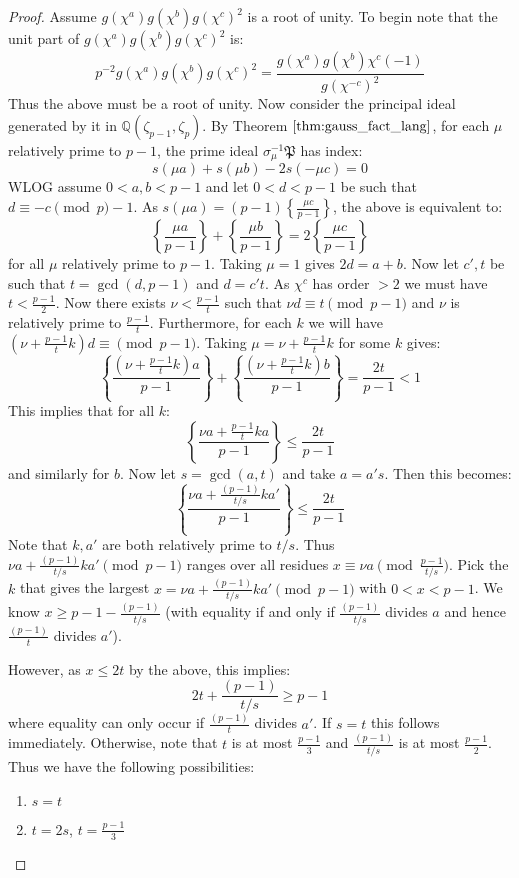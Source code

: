 \documentclass{article}
\newcommand{\Q}{\mathbb{Q}}
\newcommand{\frp}[2]{\left\{\frac{#1}{#2}\right\}}
\theoremstyle{definition}
\theoremstyle{definition}
\theoremstyle{remark}
\begin{document}
\begin{proof} Assume $g(\chi^a)g(\chi^b)g(\chi^c)^2$ is a root of unity. To begin note that the unit part of $g(\chi^a)g(\chi^b)g(\chi^c)^2$ is:
\[p^{-2}g(\chi^a)g(\chi^b)g(\chi^c)^2 = \frac{g(\chi^a)g(\chi^b)\chi^{c}(-1)}{g(\chi^{-c})^2 } \]
Thus the above must be a root of unity. Now consider the principal ideal generated by it in $\Q(\zeta_{p-1}, \zeta_p)$. By Theorem $\ref{thm:gauss_fact_lang}$, for each $\mu$ relatively prime to $p-1$, the prime ideal $\sigma_{\mu}^{-1}\mathfrak{P}$ has index:
\[s(\mu a) + s(\mu b) - 2s(-\mu c) = 0\]
WLOG assume $0 < a,b < p-1$ and let $0 < d < p-1$ be such that $d \equiv -c \pmod p - 1$. As $s(\mu a) = (p-1)\left\{\frac{\mu c}{p - 1}\right\}$, the above is equivalent to:
\[\frp{\mu a}{p-1} + \frp{\mu b}{p-1} = 2\frp{\mu c}{p-1}\]
for all $\mu$ relatively prime to $p - 1$. Taking $\mu = 1$ gives $2d = a + b$. Now let $c', t$ be such that $t = \gcd(d, p-1)$ and $d = c't$. As $\chi^c$ has order $> 2$ we must have $t < \frac{p-1}{2}$. Now there exists $\nu < \frac{p-1}{t}$ such that $\nu d \equiv t \pmod {p-1}$ and $\nu$ is relatively prime to $\frac{p-1}{t}$. Furthermore, for each $k$ we will have $\left(\nu + \frac{p-1}{t}k\right) d \equiv \pmod{p-1}$. Taking $\mu = \nu + \frac{p-1}{t}k$ for some $k$ gives:
\[\frp{\left( \nu + \frac{p-1}{t}k\right) a}{p-1} + \frp{\left( \nu + \frac{p-1}{t}k\right)  b}{p-1} = \frac{2t}{p-1} < 1\]
This implies that for all $k$:
\[\frp{\nu a + \frac{p-1}{t}ka}{p-1} \le \frac{2t}{p-1}\]
and similarly for $b$. Now let $s = \gcd(a,t)$ and take $a = a's$. Then this becomes:
\[\frp{\nu a + \frac{(p-1)}{t/s}ka'}{p-1} \le \frac{2t}{p-1}\]
Note that $k, a'$ are both relatively prime to $t/s$. Thus $\nu a + \frac{(p-1)}{t/s}ka' \pmod{p-1}$ ranges over all residues $x \equiv \nu a \pmod {\frac{p-1}{t/s}}$. Pick the $k$ that gives the largest $x = \nu a + \frac{(p-1)}{t/s}ka' \pmod{p-1} $ with $0 <  x < p-1$. We know $x \ge p - 1 - \frac{(p-1)}{t/s}$ (with equality if and only if $\frac{(p-1)}{t/s}$ divides $a$ and hence $\frac{(p-1)}{t}$ divides $a'$). 
\par
However, as $x \le 2t$ by the above, this implies:
\[2t + \frac{(p-1)}{t/s} \ge p-1\]
where equality can only occur if $\frac{(p-1)}{t}$ divides $a'$. If $s = t$ this follows immediately. Otherwise, note that $t$ is at most $\frac{p-1}{3}$ and $\frac{(p-1)}{t/s}$ is at most $\frac{p-1}{2}$. Thus we have the following possibilities:
\begin{enumerate}
\item $s = t$
\item $t  = 2s$, $t = \frac{p-1}{3}$

\end{enumerate}
\end{proof}
\end{document}
